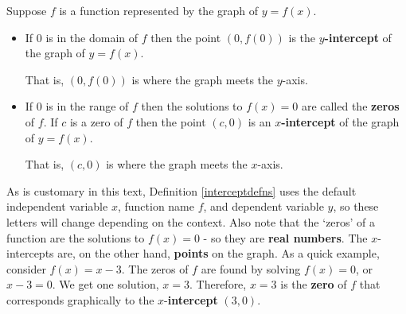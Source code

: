 \documentclass{ximera}
\begin{document}

\begin{definition}\label{interceptdefns}

Suppose $f$ is a function represented by the graph of $y = f(x)$.

\begin{itemize}

\item  If $0$ is in the domain of $f$ then the point $(0, f(0))$ is the   \textbf{$y$-intercept} of the graph of $y = f(x)$.

That is, $(0,f(0))$ is where the graph meets the $y$-axis.

\item  If $0$ is in the range of $f$ then the solutions to $f(x) = 0$ are called the  \textbf{zeros} of $f$.  If $c$ is a zero of $f$ then the point $(c,0)$ is an   \textbf{$x$-intercept} of the graph of $y = f(x)$.

That is, $(c,0)$ is where the graph meets the $x$-axis.

\end{itemize}

\end{definition}

As is customary in this text, Definition \ref{interceptdefns} uses the default independent variable $x$, function name $f$, and dependent variable $y$, so these letters will change depending on the context.  Also note that the `zeros' of a function are the solutions to $f(x) = 0$ - so they are \textbf{real numbers}.  The $x$-intercepts are, on the other hand, \textbf{points} on the graph.  As a quick example, consider $f(x) = x-3$.  The zeros of $f$ are found by solving $f(x) = 0$, or $x-3=0$.  We get one solution, $x = 3$.  Therefore, $x=3$ is the \textbf{zero} of $f$ that corresponds graphically to the $x$-\textbf{intercept} $(3,0)$.  
\end{document}

